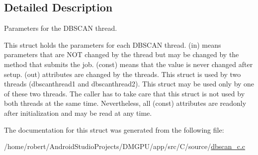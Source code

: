 \subsection{Detailed Description}
Parameters for the D\+B\+S\+C\+AN thread. 

This struct holds the parameters for each D\+B\+S\+C\+AN thread. (in) means parameters that are N\+OT changed by the thread but may be changed by the method that submits the job. (const) means that the value is never changed after setup. (out) attributes are changed by the threads. This struct is used by two threads (dbscanthread1 and dbscanthread2). This struct may be used only by one of these two threads. The caller has to take care that this struct is not used by both threads at the same time. Nevertheless, all (const) attributes are readonly after initialization and may be read at any time. 

The documentation for this struct was generated from the following file\+:\begin{DoxyCompactItemize}
\item 
/home/robert/\+Android\+Studio\+Projects/\+D\+M\+G\+P\+U/app/src/\+C/source/\mbox{\hyperlink{dbscan__c_8c}{dbscan\+\_\+c.\+c}}\end{DoxyCompactItemize}
